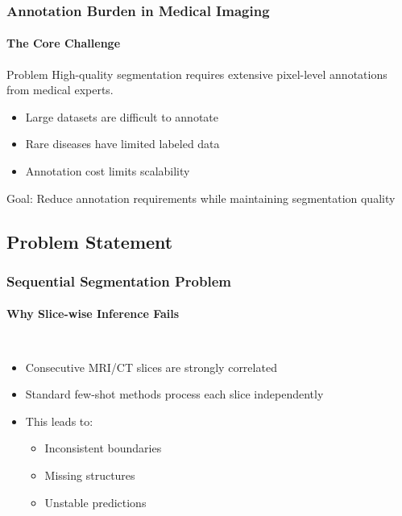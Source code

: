 \documentclass[nometaot,lecture,amberg,autotoc,toc=twocolumn,indicatelastpageofframe,footlinebox]{OTHAWbeamer}
\begin{document}
\begin{frame}
    \frametitle{Annotation Burden in Medical Imaging}
    \framesubtitle{The Core Challenge}

    \begin{block}{Problem}
        High-quality segmentation requires extensive pixel-level annotations from medical experts.
    \end{block}

    \vspace{0.8em}

    \begin{itemize}
        \item Large datasets are difficult to annotate
        \item Rare diseases have limited labeled data
        \item Annotation cost limits scalability
    \end{itemize}

    \vspace{1em}

    \centering
    \Large
    Goal: Reduce annotation requirements while maintaining segmentation quality

\end{frame}

\subsection{Problem Statement}

\begin{frame}
    \frametitle{Sequential Segmentation Problem}
    \framesubtitle{Why Slice-wise Inference Fails}

    \begin{columns}[T]


        \begin{itemize}
            \item Consecutive MRI/CT slices are strongly correlated

            \item Standard few-shot methods process each slice independently

            \item This leads to:
            \begin{itemize}
                \item Inconsistent boundaries
                \item Missing structures
                \item Unstable predictions
            \end{itemize}
        \end{itemize}



    \end{columns}

\end{frame}
\end{document}
